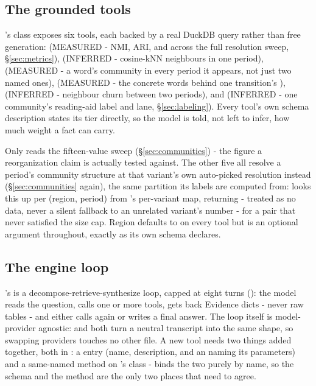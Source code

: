 \documentclass[11pt]{article}
\begin{document}
\subsection{The grounded tools}

's  class exposes six tools, each
backed by a real DuckDB query rather than free generation:
 (MEASURED - NMI, ARI, and
 across the full resolution sweep,
\S\ref{sec:metrics}),  (INFERRED - cosine-kNN
neighbours in one period),  (MEASURED - a
word's community in every period it appears, not just two named ones),
 (MEASURED - the concrete words behind one
transition's ), 
(INFERRED - neighbour churn between two periods), and
 (INFERRED - one community's reading-aid label and
lane, \S\ref{sec:labeling}). Every tool's own schema description
states its tier directly, so the model is told, not left to infer, how
much weight a fact can carry.

Only  reads the fifteen-value sweep
(\S\ref{sec:communities}) - the figure a reorganization claim is
actually tested against. The other five all resolve a period's
community structure at that variant's own auto-picked 
resolution instead (\S\ref{sec:communities} again), the same partition
its labels are computed from:  looks this up
per (region, period) from 's per-variant
map, returning  - treated as no data, never a silent
fallback to an unrelated variant's number - for a pair that never
satisfied the size cap. Region defaults to  on every
tool but is an optional argument throughout, exactly as its own schema
declares.

\subsection{The engine loop}

's  is a
decompose-retrieve-synthesize loop, capped at eight turns
(): the model reads the question, calls one or more
tools, gets back Evidence dicts - never raw tables - and either calls
again or writes a final answer. The loop itself is model-provider
agnostic:  and  both turn
a neutral transcript into the same 
shape, so swapping providers touches no other file. A new tool needs
two things added together, both in : a
 entry (name, description, and an
 naming its parameters) and a same-named method on
's  class -  binds the two
purely by name, so the schema and the method are the only two places
that need to agree.
\end{document}
